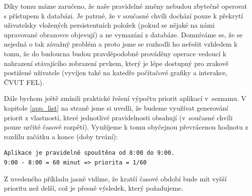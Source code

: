 \documentclass[thesis=M,czech]{FITthesis}[2012/06/26]
\begin{document}
Díky tomu máme zaručeno, že naše pravidelné změny nebudou zbytečně operovat s přístupem k databázi. Je patrné, že v současné chvíli dochází pouze k překrytí uživatelsky vložených persistentních položek (pokud se nějaké na námi upravované obrazovce objevují) a ne vymazání z databáze. Domníváme se, že se nejedná o tak závažný problém a proto jsme se rozhodli ho neřešit vzhledem k tomu, že do budoucna budou pravděpodobně prováděny operace vedoucí k nahrazení stávajícího zobrazení prvkem, který je lépe dostupný pro zrakově postižené uživatele (vyvíjen také na katedře počítačové grafiky a interakce, ČVUT FEL).

Dále bychom ještě zmínili praktické řešení výpočtu priorit aplikací v~seznamu. V kapitole \ref{app_list} na straně \pageref{app_list} jsme si uvedli, že budeme využívat generování priorit z vlastností, které jednotlivé pravidelnosti obsahují (v~současné chvíli pouze určité časové rozpětí). Využijeme k tomu obyčejnou převrácenou hodnotu z rozdílu začátku a konce (doby trvání):

\begin{verbatim}
Aplikace je pravidelně spouštěna od 8:00 do 9:00.
9:00 - 8:00 = 60 minut => priorita = 1/60
\end{verbatim}

Z uvedeného příkladu jasně vidíme, že kratší časové období bude mít vyšší prioritu než delší, což je přesně výsledek, který požadujeme.
\end{document}
